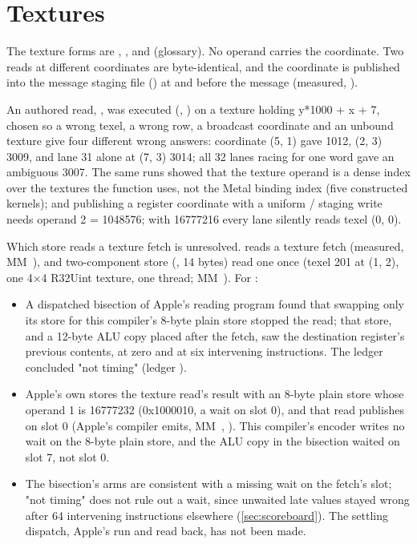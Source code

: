\section{Textures}\label{sec:textures}

The texture forms are , ,  and  (glossary). No operand carries the coordinate. Two reads at different coordinates are byte-identical, and the
coordinate is published into the message staging file () at \code{[op4+0*4]} and \code{[op4+2*4]} before the message (measured,
).

An authored read, , was executed (,
) on a texture holding y*1000 + x + 7, chosen so a wrong texel, a wrong row, a broadcast coordinate and an unbound texture
give four different wrong answers: coordinate (5, 1) gave 1012, (2, 3) 3009, and lane 31 alone at (7, 3) 3014; all 32
lanes racing for one word gave an ambiguous 3007. The same runs showed that the texture operand is a dense index over
the textures the function uses, not the Metal binding index (five constructed kernels); and publishing a register
coordinate with a uniform / staging write needs operand 2 = 1048576; with 16777216 every lane silently reads texel (0, 0).

Which store reads a texture fetch is unresolved.  reads a texture fetch (measured,
MM~), and two-component store (, 14 bytes) read one once (texel 201 at (1, 2), one 4×4 R32Uint texture, one
thread; MM~). For :

\begin{itemize}
\item A dispatched bisection of Apple's reading program found that swapping only its store for this compiler's 8-byte
  plain store stopped the read; that store, and a 12-byte ALU copy placed after the fetch, saw the destination register's
  previous contents, at zero and at six intervening instructions. The ledger concluded "not timing" (ledger
  ).
\item Apple's own  stores the texture read's result with an 8-byte plain store whose operand 1 is 16777232
  (0x1000010, a wait on slot 0), and that read publishes on slot 0 (Apple's compiler emits, MM~,
  ). This compiler's encoder writes no wait on the 8-byte plain store, and the ALU copy in the
  bisection waited on slot 7, not slot 0.
\item The bisection's arms are consistent with a missing wait on the fetch's slot; "not timing" does not
  rule out a wait, since unwaited late values stayed wrong after 64 intervening instructions elsewhere (\cref{sec:scoreboard}). The settling
  dispatch, Apple's  run and read back, has not been made.
\end{itemize}

